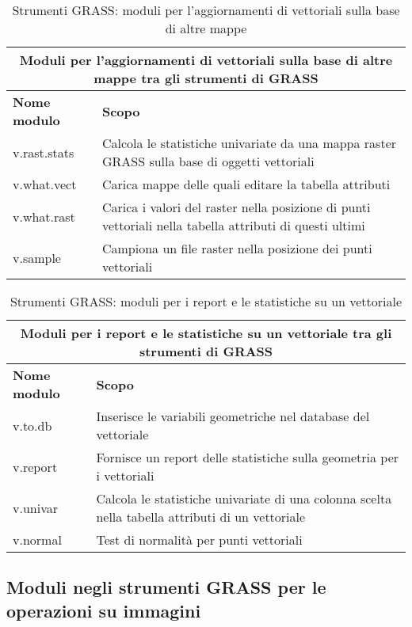 \begin{table}[ht]
\centering
\caption{Strumenti GRASS: moduli per l'aggiornamenti di vettoriali sulla base di altre mappe}\medskip
 \begin{tabular}{|p{4cm}|p{12cm}|}
  \hline \multicolumn{2}{|c|}{\textbf{Moduli per l'aggiornamenti di vettoriali sulla base di altre mappe tra gli strumenti di GRASS}} \\
  \hline \textbf{Nome modulo} & \textbf{Scopo} \\
  \hline v.rast.stats & Calcola le statistiche univariate da una mappa raster GRASS sulla base di oggetti vettoriali \\
  \hline v.what.vect & Carica mappe delle quali editare la tabella attributi \\
  \hline v.what.rast & Carica i valori del raster nella posizione di punti vettoriali nella tabella attributi di questi ultimi \\
  \hline v.sample & Campiona un file raster nella posizione dei punti vettoriali \\
\hline
\end{tabular}
\end{table}

\begin{table}[ht]
\centering
\caption{Strumenti GRASS: moduli per i report e le statistiche su un vettoriale}\medskip
 \begin{tabular}{|p{4cm}|p{12cm}|}
  \hline \multicolumn{2}{|c|}{\textbf{Moduli per i report e le statistiche su un vettoriale tra gli strumenti di GRASS}} \\
  \hline \textbf{Nome modulo} & \textbf{Scopo} \\
  \hline v.to.db & Inserisce le variabili geometriche nel database del vettoriale \\
  \hline v.report & Fornisce un report delle statistiche sulla geometria per i vettoriali \\
  \hline v.univar & Calcola le statistiche univariate di una colonna scelta nella tabella attributi di un vettoriale \\
  \hline v.normal & Test di normalità per punti vettoriali \\
\hline
\end{tabular}
\end{table}

\clearpage

\subsection{Moduli negli strumenti GRASS per le operazioni su immagini}


